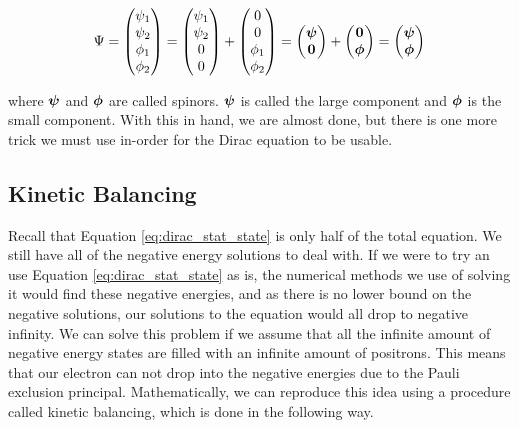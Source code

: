 \documentclass[12pt]{report}
\begin{document}
\begin{equation}
\label{eq:4c_wave}
\Psi =
\begin{pmatrix}
\psi_{1}	\\
\psi_{2}	\\
\phi_{1}	\\
\phi_{2}	\\
\end{pmatrix}
=
\begin{pmatrix}
\psi_{1}	\\
\psi_{2}	\\
0	\\
0	\\
\end{pmatrix}
+
\begin{pmatrix}
0	\\
0	\\
\phi_{1}	\\
\phi_{2}	\\
\end{pmatrix}
=
\begin{pmatrix}
{\bf{\psi}}	\\
\textbf{0}	\\
\end{pmatrix}
+
\begin{pmatrix}
\textbf{0}	\\
{\bf{\phi}}	\\
\end{pmatrix}
=
\begin{pmatrix}
{\bf{\psi}}	\\
{\bf{\phi}}	\\
\end{pmatrix}
\end{equation}

where ${\bf{\psi}}$ and ${\bf{\phi}}$ are called spinors. ${\bf{\psi}}$ is called the large component and ${\bf{\phi}}$ is the small component. With this in hand, we are almost done, but there is one more trick we must use in-order for the Dirac equation to be usable. 

\subsection{Kinetic Balancing}
Recall that Equation \ref{eq:dirac_stat_state} is only half of the total equation. We still have all of the negative energy solutions to deal with. If we were to try an use Equation \ref{eq:dirac_stat_state} as is, the numerical methods we use of solving it would find these negative energies, and as there is no lower bound on the negative solutions, our solutions to the equation would all drop to negative infinity. We can solve this problem if we assume that all the infinite amount of negative energy states are filled with an infinite amount of positrons. This means that our electron can not drop into the negative energies due to the Pauli exclusion principal. Mathematically, we can reproduce this idea using a procedure called kinetic balancing, which is done in the following way\cite{Piela}.
 
\end{document}
